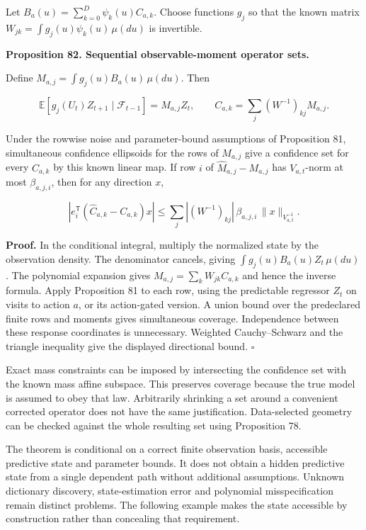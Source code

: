 Let \(B_a(u)=\sum_{k=0}^{D}\psi_k(u)C_{a,k}\). Choose functions \(g_j\)
so that the known matrix \(W_{jk}=\int g_j(u)\psi_k(u)\,\mu(du)\) is
invertible.

\textbf{Proposition 82. Sequential observable-moment operator sets.}

Define \(M_{a,j}=\int g_j(u)B_a(u)\,\mu(du)\). Then

\[
\boxed{
\mathbb E[g_j(U_t)Z_{t+1}\mid\mathcal F_{t-1}]
=M_{a,j}Z_t,
\qquad
C_{a,k}=\sum_j(W^{-1})_{kj}M_{a,j}.
}
\]

Under the rowwise noise and parameter-bound assumptions of Proposition
81, simultaneous confidence ellipsoids for the rows of \(M_{a,j}\) give
a confidence set for every \(C_{a,k}\) by this known linear map. If row
\(i\) of \(\widehat M_{a,j}-M_{a,j}\) has \(V_{a,t}\)-norm at most
\(\beta_{a,j,i}\), then for any direction \(x\),

\[
\left|e_i^{\mathsf T}(\widehat C_{a,k}-C_{a,k})x\right|
\leq
\sum_j |(W^{-1})_{kj}|\,
\beta_{a,j,i}\,\|x\|_{V_{a,t}^{-1}}.
\]

\textbf{Proof.} In the conditional integral, multiply the normalized
state by the observation density. The denominator cancels, giving
\(\int g_j(u)B_a(u)Z_t\,\mu(du)\). The polynomial expansion gives
\(M_{a,j}=\sum_kW_{jk}C_{a,k}\) and hence the inverse formula. Apply
Proposition 81 to each row, using the predictable regressor \(Z_t\) on
visits to action \(a\), or its action-gated version. A union bound over
the predeclared finite rows and moments gives simultaneous coverage.
Independence between these response coordinates is unnecessary. Weighted
Cauchy--Schwarz and the triangle inequality give the displayed
directional bound. \(\square\)

Exact mass constraints can be imposed by intersecting the confidence set
with the known mass affine subspace. This preserves coverage because the
true model is assumed to obey that law. Arbitrarily shrinking a set
around a convenient corrected operator does not have the same
justification. Data-selected geometry can be checked against the whole
resulting set using Proposition 78.

The theorem is conditional on a correct finite observation basis,
accessible predictive state and parameter bounds. It does not obtain a
hidden predictive state from a single dependent path without additional
assumptions. Unknown dictionary discovery, state-estimation error and
polynomial misspecification remain distinct problems. The following
example makes the state accessible by construction rather than
concealing that requirement.


